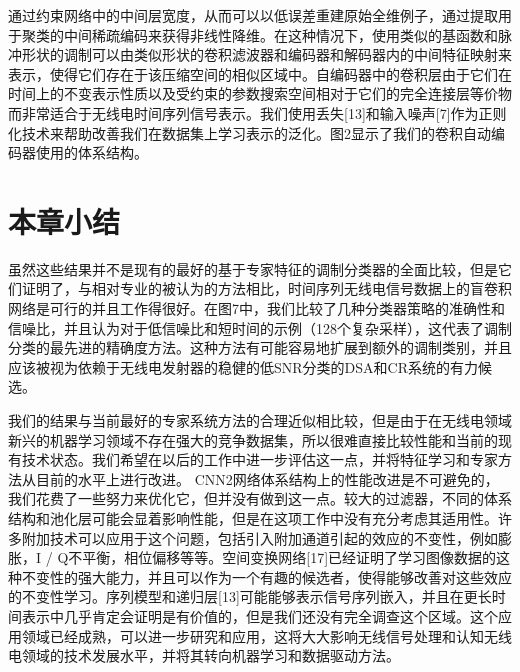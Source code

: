 通过约束网络中的中间层宽度，从而可以以低误差重建原始全维例子，通过提取用于聚类的中间稀疏编码来获得非线性降维。在这种情况下，使用类似的基函数和脉冲形状的调制可以由类似形状的卷积滤波器和编码器和解码器内的中间特征映射来表示，使得它们存在于该压缩空间的相似区域中。自编码器中的卷积层由于它们在时间上的不变表示性质以及受约束的参数搜索空间相对于它们的完全连接层等价物而非常适合于无线电时间序列信号表示。我们使用丢失[13]和输入噪声[7]作为正则化技术来帮助改善我们在数据集上学习表示的泛化。图2显示了我们的卷积自动编码器使用的体系结构。\par

\section{本章小结}

虽然这些结果并不是现有的最好的基于专家特征的调制分类器的全面比较，但是它们证明了，与相对专业的被认为的方法相比，时间序列无线电信号数据上的盲卷积网络是可行的并且工作得很好。在图7中，我们比较了几种分类器策略的准确性和信噪比，并且认为对于低信噪比和短时间的示例（128个复杂采样），这代表了调制分类的最先进的精确度方法。这种方法有可能容易地扩展到额外的调制类别，并且应该被视为依赖于无线电发射器的稳健的低SNR分类的DSA和CR系统的有力候选。\par

我们的结果与当前最好的专家系统方法的合理近似相比较，但是由于在无线电领域新兴的机器学习领域不存在强大的竞争数据集，所以很难直接比较性能和当前的现有技术状态。我们希望在以后的工作中进一步评估这一点，并将特征学习和专家方法从目前的水平上进行改进。 CNN2网络体系结构上的性能改进是不可避免的，我们花费了一些努力来优化它，但并没有做到这一点。较大的过滤器，不同的体系结构和池化层可能会显着影响性能，但是在这项工作中没有充分考虑其适用性。许多附加技术可以应用于这个问题，包括引入附加通道引起的效应的不变性，例如膨胀，I / Q不平衡，相位偏移等等。空间变换网络[17]已经证明了学习图像数据的这种不变性的强大能力，并且可以作为一个有趣的候选者，使得能够改善对这些效应的不变性学习。序列模型和递归层[13]可能能够表示信号序列嵌入，并且在更长时间表示中几乎肯定会证明是有价值的，但是我们还没有完全调查这个区域。这个应用领域已经成熟，可以进一步研究和应用，这将大大影响无线信号处理和认知无线电领域的技术发展水平，并将其转向机器学习和数据驱动方法。\par

